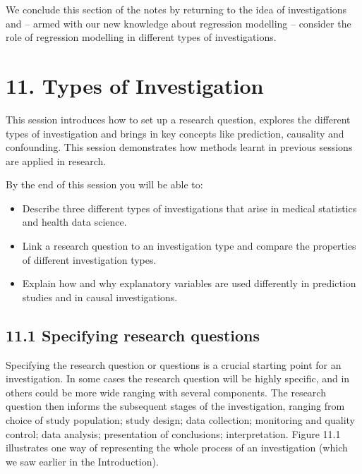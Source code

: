 \documentclass[letterpaper,10pt,english]{jupyterBook}
\begin{document}
\sphinxAtStartPar
We conclude this section of the notes by returning to the idea of investigations and – armed with our new knowledge about regression modelling – consider the role of regression modelling in different types of investigations.


\chapter{11. Types of Investigation}
\label{\detokenize{11.a. Types of Investigation:types-of-investigation}}\label{\detokenize{11.a. Types of Investigation::doc}}
\sphinxAtStartPar
This session introduces how to set up a research question, explores the different types of investigation and brings in key concepts like prediction, causality and confounding. This session demonstrates how methods learnt in previous sessions are applied in research.



\sphinxAtStartPar
By the end of this session you will be able to:
\begin{itemize}
\item {} 
\sphinxAtStartPar
Describe three different types of investigations that arise in medical statistics and health data science.

\item {} 
\sphinxAtStartPar
Link a research question to an investigation type and compare the properties of different investigation types.

\item {} 
\sphinxAtStartPar
Explain how and why explanatory variables are used differently in prediction studies and in causal investigations.

\end{itemize}




\section{11.1 Specifying research questions}
\label{\detokenize{11.b. Types of Investigation:specifying-research-questions}}\label{\detokenize{11.b. Types of Investigation::doc}}
\sphinxAtStartPar
Specifying the research question or questions is a crucial starting point for an investigation. In some cases the research question will be highly specific, and in others could be more wide ranging with several components. The research question then informs the subsequent stages of the investigation, ranging from choice of study population; study design; data collection; monitoring and quality control; data analysis; presentation of conclusions; interpretation. Figure 11.1 illustrates one
way of representing the whole process of an investigation (which we saw earlier in the Introduction).
\end{document}
